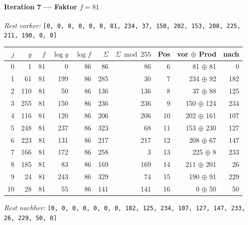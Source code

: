 \paragraph{Iteration 7 — Faktor $f = 81$}
\textit{Rest vorher:} \texttt{[0, 0, 0, 0, 0, 0, 81, 234, 37, 150, 202, 153, 208, 225, 211, 190, 0, 0]}\par
\begin{center}
\footnotesize
\setlength{\tabcolsep}{4pt}
\renewcommand{\arraystretch}{1.1}
\begin{tabular}{r|rr|rrrr|rrr}
\toprule
$j$ & $g$ & $f$ & $\log g$ & $\log f$ & $\Sigma$ & $\Sigma\bmod 255$ & Pos & vor $\oplus$ Prod & nach \\
\midrule
0 & 1 & 81 & 0 & 86 & 86 & 86 & 6 & 81 $\oplus$ 81 & 0 \\
1 & 61 & 81 & 199 & 86 & 285 & 30 & 7 & 234 $\oplus$ 92 & 182 \\
2 & 110 & 81 & 50 & 86 & 136 & 136 & 8 & 37 $\oplus$ 88 & 125 \\
3 & 255 & 81 & 150 & 86 & 236 & 236 & 9 & 150 $\oplus$ 124 & 234 \\
4 & 116 & 81 & 120 & 86 & 206 & 206 & 10 & 202 $\oplus$ 161 & 107 \\
5 & 248 & 81 & 237 & 86 & 323 & 68 & 11 & 153 $\oplus$ 230 & 127 \\
6 & 223 & 81 & 131 & 86 & 217 & 217 & 12 & 208 $\oplus$ 67 & 147 \\
7 & 166 & 81 & 172 & 86 & 258 & 3 & 13 & 225 $\oplus$ 8 & 233 \\
8 & 185 & 81 & 83 & 86 & 169 & 169 & 14 & 211 $\oplus$ 201 & 26 \\
9 & 24 & 81 & 243 & 86 & 329 & 74 & 15 & 190 $\oplus$ 91 & 229 \\
10 & 28 & 81 & 55 & 86 & 141 & 141 & 16 & 0 $\oplus$ 50 & 50 \\
\bottomrule
\end{tabular}
\end{center}
\textit{Rest nachher:} \texttt{[0, 0, 0, 0, 0, 0, 0, 182, 125, 234, 107, 127, 147, 233, 26, 229, 50, 0]}\par\medskip
